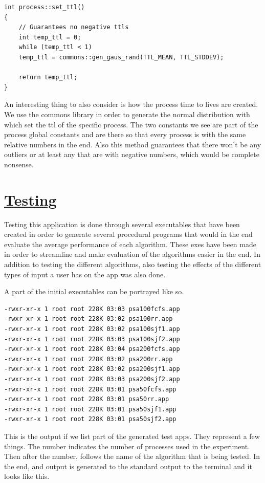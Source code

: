 \documentclass{article}
\begin{document}
\begin{lstlisting}
int process::set_ttl()
{
    // Guarantees no negative ttls
    int temp_ttl = 0;
    while (temp_ttl < 1)
	temp_ttl = commons::gen_gaus_rand(TTL_MEAN, TTL_STDDEV);

    return temp_ttl;
}
\end{lstlisting}

An interesting thing to also consider is how the process time to lives are created. We use the commons library in order to generate the normal distribution with which set the ttl of the specific process. The two constants we see are part of the process global constants and are there so that every process is with the same relative numbers in the end. Also this method guarantees that there won't be any outliers or at least any that are with negative numbers, which would be complete nonsense.

\section{\underline{Testing}}

Testing this application is done through several executables that have been created in order to generate several procedural programs that would in the end evaluate the average performance of each algorithm. These exes have been made in order to streamline and make evaluation of the algorithms easier in the end. In addition to testing the different algorithms, also testing the effects of the different types of input a user has on the app was also done.

A part of the initial executables can be portrayed like so.

\begin{lstlisting}
-rwxr-xr-x 1 root root 228K 03:03 psa100fcfs.app
-rwxr-xr-x 1 root root 228K 03:02 psa100rr.app
-rwxr-xr-x 1 root root 228K 03:02 psa100sjf1.app
-rwxr-xr-x 1 root root 228K 03:03 psa100sjf2.app
-rwxr-xr-x 1 root root 228K 03:04 psa200fcfs.app
-rwxr-xr-x 1 root root 228K 03:02 psa200rr.app
-rwxr-xr-x 1 root root 228K 03:02 psa200sjf1.app
-rwxr-xr-x 1 root root 228K 03:03 psa200sjf2.app
-rwxr-xr-x 1 root root 228K 03:01 psa50fcfs.app
-rwxr-xr-x 1 root root 228K 03:01 psa50rr.app
-rwxr-xr-x 1 root root 228K 03:01 psa50sjf1.app
-rwxr-xr-x 1 root root 228K 03:01 psa50sjf2.app
\end{lstlisting}

This is the output if we list part of the generated test apps. They represent a few things. The number indicates the number of processes used in the experiment. Then after the number, follows the name of the algorithm that is being tested. In the end, and output is generated to the standard output to the terminal and it looks like this.
\end{document}
